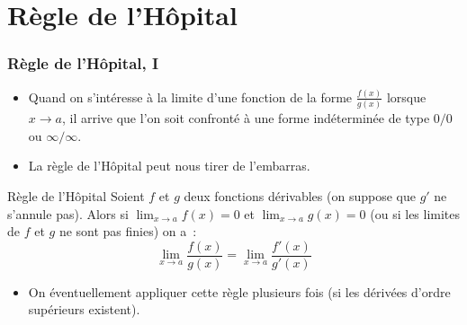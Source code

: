 \documentclass[10pt,notheorems]{beamer}
\theoremstyle{plain}
\theoremstyle{definition} %
\begin{document}
\section{Règle de l'Hôpital}


\begin{frame}
  \frametitle{Règle de l'Hôpital, I}

  \begin{itemize}

  \item Quand on s'intéresse à la limite d'une fonction de la forme
    $\frac{f(x)}{g(x)}$ lorsque $x\rightarrow a$, il arrive que l'on
    soit confronté à une forme indéterminée de type $0/0$ ou
    $\infty/\infty$.\newline

  \item La règle de l'Hôpital peut nous tirer de l'embarras.\newline

  \end{itemize}

  \begin{block}{Règle de l'Hôpital}
    Soient $f$ et $g$ deux fonctions dérivables (on suppose que $g'$ ne s'annule pas). Alors si $\lim_{x\rightarrow a}f(x) = 0$ et $\lim_{x\rightarrow a}g(x) = 0$ (ou si les limites de $f$ et $g$ ne sont pas finies) on a~:
    \[
      \lim_{x\rightarrow a} \frac{f(x)}{g(x)} = \lim_{x\rightarrow a} \frac{f'(x)}{g'(x)}
    \]
  \end{block}

  \medskip

  \begin{itemize}

  \item On éventuellement appliquer cette règle plusieurs fois (si les dérivées d'ordre supérieurs existent).

  \end{itemize}

\end{frame}
\end{document}
